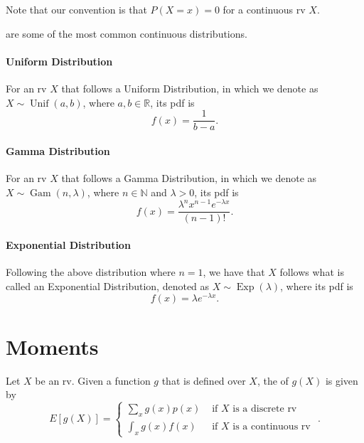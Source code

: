 \documentclass[notoc,notitlepage]{tufte-book}
\DeclareMathOperator{\Exp}{Exp }
\DeclareMathOperator{\Unif}{Unif }
\DeclareMathOperator{\Gam}{Gam }
\begin{document}
\begin{note}
  Note that our convention is that $P(X = x) = 0$ for a continuous rv $X$.
\end{note}

 are some of the most common continuous distributions.

\paragraph{Uniform Distribution} For an rv $X$ that follows a Uniform Distribution, in which we denote as $X \sim \Unif(a, b)$, where $a, b \in \mathbb{R}$, its pdf is
\begin{equation*}
  f(x) = \frac{1}{b - a}.
\end{equation*}

\paragraph{Gamma Distribution} For an rv $X$ that follows a Gamma Distribution, in which we denote as $X \sim \Gam(n, \lambda)$, where $n \in \mathbb{N}$ and $\lambda > 0$, its pdf is
\begin{equation*}
  f(x) = \frac{\lambda^n x^{n - 1} e^{-\lambda x}}{( n - 1 )!}.
\end{equation*}

\paragraph{Exponential Distribution} Following the above distribution where $n = 1$, we have that $X$ follows what is called an Exponential Distribution, denoted as $X \sim \Exp(\lambda)$, where its pdf is
\begin{equation*}
  f(x) = \lambda e^{- \lambda x}.
\end{equation*}



\section{Moments}%
\label{sec:moments}

\begin{defn}[Expectation]
  \label{defn:expectation}
  Let $X$ be an rv. Given a function $g$ that is defined over $X$, the  of $g(X)$ is given by
  \begin{equation*}
    E[ g(X) ] = \begin{cases}
      \sum_{x} g(x) p(x) & \text{ if } X \text{ is a discrete rv } \\
      \int_{x} g(x) f(x) & \text{ if } X \text{ is a continuous rv }
    \end{cases}.
  \end{equation*}
\end{defn}
\end{document}
